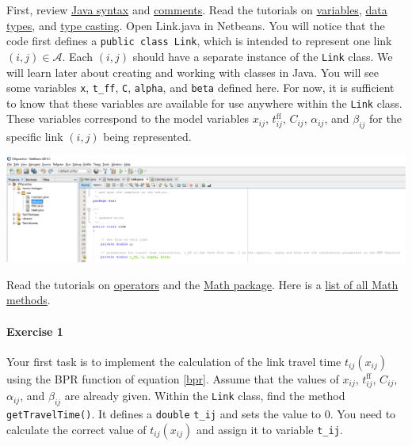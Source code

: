 \documentclass[12pt]{article}
\newcommand{\A}{\mathcal{A}}
\newcommand{\tff}{t^{\mathrm{ff}}_{ij}}
\begin{document}
First, review \href{https://www.w3schools.com/java/java_syntax.asp}{Java syntax} and \href{https://www.w3schools.com/java/java_comments.asp}{comments}.
Read the tutorials on \href{https://www.w3schools.com/java/java_variables.asp}{variables}, \href{https://www.w3schools.com/java/java_data_types.asp}{data types}, and \href{https://www.w3schools.com/java/java_math.asp}{type casting}. 
Open Link.java in Netbeans. You will notice that the code first defines a \texttt{public class Link}, which is intended to represent one link $(i,j)\in\A$. Each $(i,j)$ should have a separate instance of the \texttt{Link} class. 
We will learn later about creating and working with classes in Java. You will see some variables \texttt{x}, \texttt{t\_ff}, \texttt{C}, \texttt{alpha}, and \texttt{beta} defined here. For now, it is sufficient to know that these variables are available for use anywhere within the \texttt{Link} class. These variables correspond to the model variables $x_{ij}$, $t^{\mathrm{ff}}_{ij}$, $C_{ij}$, $\alpha_{ij}$, and $\beta_{ij}$ for the specific link $(i,j)$ being represented. 

\begin{center}
\includegraphics[width=\textwidth]{netbeans2.png}
\end{center}


\noindent Read the  tutorials on \href{https://www.w3schools.com/java/java_operators.asp}{operators} and the \href{https://www.w3schools.com/java/java_math.asp}{Math package}. Here is a \href{https://www.w3schools.com/java/java_ref_math.asp}{list of all Math methods}.
	
	
\paragraph*{Exercise 1} Your first task is to implement the calculation of the link travel time $t_{ij}(x_{ij})$ using the BPR function of equation \eqref{bpr}. Assume that the values of $x_{ij}$, $\tff$, $C_{ij}$, $\alpha_{ij}$, and $\beta_{ij}$ are already given. Within the \texttt{Link} class, find the method \texttt{getTravelTime()}. It defines a \texttt{double} \texttt{t\_{ij}} and sets the value to 0. You need to calculate the correct value of $t_{ij}(x_{ij})$ and assign it to variable \texttt{t\_ij}. 
	
\end{document}
